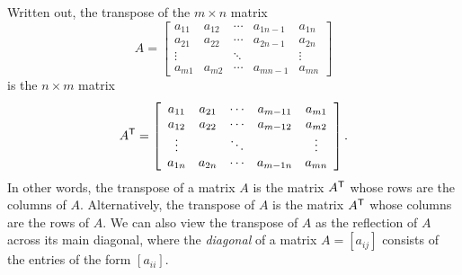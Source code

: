 Written out, the transpose of the $m \times n$ matrix 
\[A = \left[ \begin{array}{ccccc}
a_{11} & a_{12} & \cdots    & a_{1n-1} & a_{1n} \\
a_{21} & a_{22} & \cdots    & a_{2n-1} & a_{2n} \\
 \vdots &       & \ddots    &           &\vdots \\
a_{m1} & a_{m2} & \cdots    & a_{mn-1} & a_{mn}
\end{array} \right]\]
is the $n \times m$ matrix
\[A^{\mathsf{T}} = \left[ \begin{array}{ccccc}
a_{11} & a_{21} & \cdots & a_{m-11} & a_{m1} \\
a_{12} & a_{22} & \cdots & a_{m-12} & a_{m2} \\
 \vdots &       & \ddots &          &\vdots \\
a_{1n} & a_{2n} & \cdots & a_{m-1n} & a_{mn}
\end{array} \right].\]
In other words, the transpose of a matrix $A$ is the matrix $A^{\mathsf{T}}$ whose rows are the columns of $A$. Alternatively, the transpose of $A$ is the matrix $A^{\mathsf{T}}$ whose columns are the rows of $A$. We can also view the transpose of $A$ as the reflection of $A$ across its main diagonal, where the \emph{diagonal} of a matrix $A = [a_{ij}]$ consists of the entries of the form $[a_{ii}]$.   



